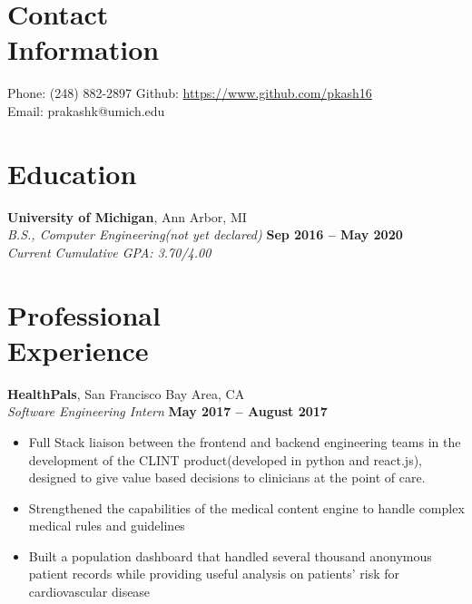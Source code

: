 \documentclass[margin,line]{resume}
\begin{document}
\begin{resume}
    \section{\mysidestyle Contact\\Information}

    Phone: (248) 882-2897       \hfill Github: \url{https://www.github.com/pkash16} \\
    \noindent Email: prakashk@umich.edu  \vspace{0mm}\\\vspace{-4.5mm}

    \section{\mysidestyle Education}

    \textbf{University of Michigan}, Ann Arbor, MI \vspace{2mm}\\\vspace{1mm}%
    \textsl{B.S., Computer Engineering(not yet declared)} \hfill \textbf{Sep 2016 -- May 2020}\\
   	\emph{Current Cumulative GPA: 3.70/4.00}

    \section{\mysidestyle Professional\\Experience}

    \textbf{HealthPals}, San Francisco Bay Area, CA \vspace{2mm}\\\vspace{1mm}%
    \textsl{Software Engineering Intern} \hfill \textbf{May 2017 -- August 2017}
    \begin{itemize}
    \item Full Stack liaison between the frontend and backend engineering teams in the development of the CLINT product(developed in python and react.js), designed to give value based decisions to clinicians at the point of care.
    \item Strengthened the capabilities of the medical content engine to handle complex medical rules and guidelines
    \item Built a population dashboard that handled several thousand anonymous patient records while providing useful analysis on patients' risk for cardiovascular disease
    \end{itemize}




\end{resume}
\end{document}
